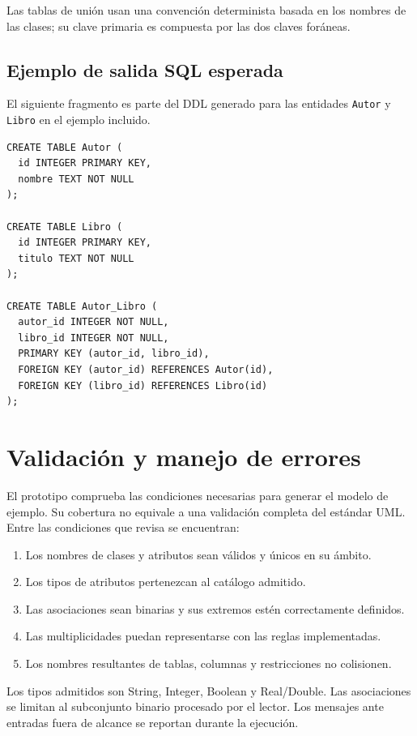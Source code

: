 \documentclass[12pt,a4paper,oneside]{report}
\begin{document}
Las tablas de unión usan una convención determinista basada en los nombres de las clases; su clave primaria es compuesta por las dos claves foráneas.

\section{Ejemplo de salida SQL esperada}
El siguiente fragmento es parte del DDL generado para las entidades \texttt{Autor} y \texttt{Libro} en el ejemplo incluido.

\begin{lstlisting}[style=sql,caption={DDL ilustrativo para una relación muchos a muchos}]
CREATE TABLE Autor (
  id INTEGER PRIMARY KEY,
  nombre TEXT NOT NULL
);

CREATE TABLE Libro (
  id INTEGER PRIMARY KEY,
  titulo TEXT NOT NULL
);

CREATE TABLE Autor_Libro (
  autor_id INTEGER NOT NULL,
  libro_id INTEGER NOT NULL,
  PRIMARY KEY (autor_id, libro_id),
  FOREIGN KEY (autor_id) REFERENCES Autor(id),
  FOREIGN KEY (libro_id) REFERENCES Libro(id)
);
\end{lstlisting}

\chapter{Validación y manejo de errores}
El prototipo comprueba las condiciones necesarias para generar el modelo de ejemplo. Su cobertura no equivale a una validación completa del estándar UML. Entre las condiciones que revisa se encuentran:
\begin{enumerate}
  \item Los nombres de clases y atributos sean válidos y únicos en su ámbito.
  \item Los tipos de atributos pertenezcan al catálogo admitido.
  \item Las asociaciones sean binarias y sus extremos estén correctamente definidos.
  \item Las multiplicidades puedan representarse con las reglas implementadas.
  \item Los nombres resultantes de tablas, columnas y restricciones no colisionen.
\end{enumerate}

Los tipos admitidos son String, Integer, Boolean y Real/Double. Las asociaciones se limitan al subconjunto binario procesado por el lector. Los mensajes ante entradas fuera de alcance se reportan durante la ejecución.
\end{document}
